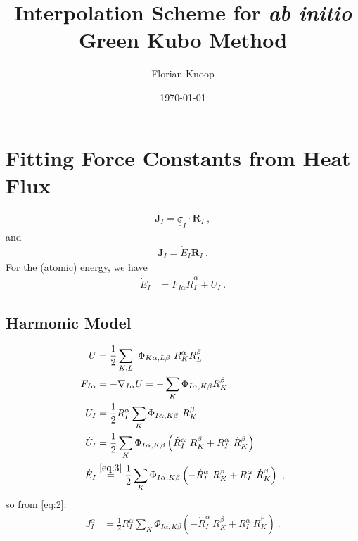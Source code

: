 \documentclass[nofootinbib,preprintnumbers,amsmath,amssymb,twocolumn]{revtex4-1}
\renewcommand{\b}[1]{\boldsymbol{#1}}
\newcommand{\halb}{\frac{1}{2}}
\newcommand{\uunderline}[1]{\underline{\underline{{#1}}}}
\begin{document}

\title{Interpolation Scheme for \emph{ab initio} Green Kubo Method}
\author{Florian Knoop}


\date{\today}
\maketitle

\section{Fitting Force Constants from Heat Flux}

\begin{align}
	\b J_I = \uunderline{\sigma}_I \cdot \b R_I~,
\end{align}
and
\begin{align}
	\b{J}_I = \dot{E}_I \b R_I~.
	\label{eq:2}
\end{align}
For the (atomic) energy, we have
\begin{align}
	\dot{E}_I &= F_{I \alpha} \dot{R}_{I}^\alpha + \dot{U}_I ~.\label{eq:3}
\end{align}

\subsection{Harmonic Model}

\begin{align}
	U &= \halb \sum_{K, L} ~ \Phi_{K \alpha, L \beta} ~ R_K^\alpha R_L^\beta \\
	F_{I \alpha} 
	&= - \nabla_{I \alpha} U 
	= - \sum_K \Phi_{I \alpha, K \beta} R_K^\beta \\
	U_I &= \halb R_I^\alpha \sum_K \Phi _{I \alpha, K \beta} ~ R_K^\beta \\
	\dot{U}_I &= 
	\halb \sum_K \Phi _{I \alpha, K \beta} \left( \dot{R}_I^\alpha ~ R_K^\beta 
	+ R_I^\alpha ~ \dot{R}_K^\beta \right) \\
	\dot{E}_I 
	&\stackrel{\eqref{eq:3}}{=}
 \halb \sum_K \Phi _{I \alpha, K \beta} \left( - \dot{R}_I^\alpha ~ R_K^\beta 
	+ R_I^\alpha ~ \dot{R}_K^\beta \right)~,
\end{align}
so from \eqref{eq:2}:
\begin{align}
	J_I^\alpha
	&= \halb R_I^\alpha \sum_K \Phi _{I \alpha, K \beta} \left( - \dot{R}_I^\alpha ~ 
	R_K^\beta 
	+ R_I^\alpha ~ \dot{R}_K^\beta \right)~.
\end{align}
\end{document}
